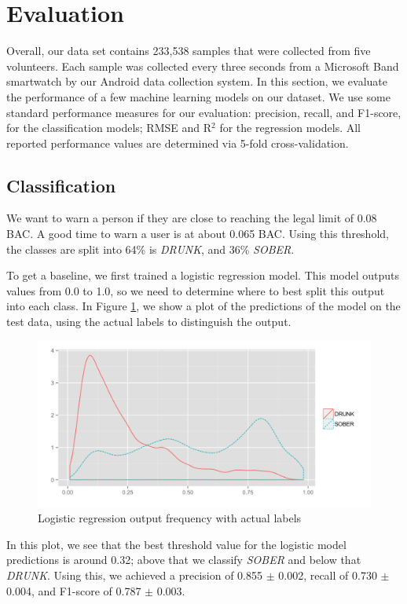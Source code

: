 \section{Evaluation}

Overall, our data set contains 233,538 samples that were collected from five volunteers. Each sample was collected every three seconds from a Microsoft Band smartwatch by our Android data collection system. In this section, we evaluate the performance of a few machine learning models on our dataset. We use some standard performance measures for our evaluation: precision, recall, and F1-score, for the classification models; RMSE and R$^2$ for the regression models. All reported performance values are determined via 5-fold cross-validation.

\subsection{Classification}

We want to warn a person if they are close to reaching the legal limit of 0.08 BAC. A good time to warn a user is at about 0.065 BAC. Using this threshold, the classes are split into 64\% is \textit{DRUNK}, and 36\% \textit{SOBER}.

To get a baseline, we first trained a logistic regression model. This model outputs values from 0.0 to 1.0, so we need to determine where to best split this output into each class. In Figure \ref{fig:log_pred_density}, we show a plot of the predictions of the model on the test data, using the actual labels to distinguish the output. \begin{figure}
	\includegraphics[width=1.0\textwidth]{../figs/log_pred_density}
	\caption{Logistic regression output frequency with actual labels}
	\label{fig:log_pred_density}
\end{figure}In this plot, we see that the best threshold value for the logistic model predictions is around 0.32; above that we classify \textit{SOBER} and below that \textit{DRUNK}. Using this, we achieved a precision of 0.855 $\pm$ 0.002, recall of 0.730 $\pm$ 0.004, and F1-score of 0.787 $\pm$ 0.003.

